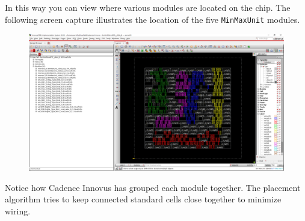 \documentclass[a4paper,12pt,twoside]{article}
\begin{document}
In this way you can view where various modules are located on the chip. The following screen capture illustrates the location of the five \texttt{MinMaxUnit} modules.
\begin{figure}[H]
    \centering
    \includegraphics[width=\textwidth]{images/15.png}
\end{figure}
Notice how Cadence Innovus has grouped each module together. The placement algorithm tries to keep connected standard cells close together to minimize wiring.
\end{document}

